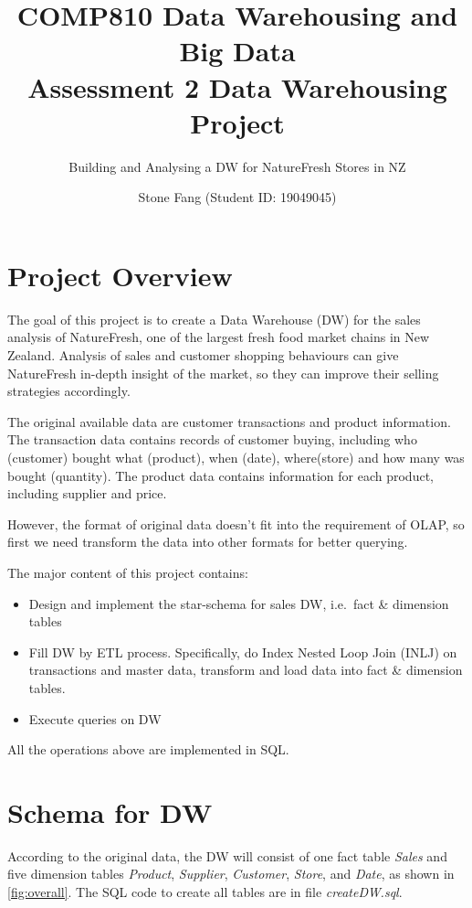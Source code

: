 \documentclass[
  a4paper,
]{article}
\title{    \textbf{COMP810 Data Warehousing and Big Data \\
    Assessment 2 Data Warehousing Project}}
\subtitle{Building and Analysing a DW for NatureFresh Stores in NZ}
\author{Stone Fang (Student ID: 19049045)}
\date{}
\providecommand{\tightlist}{%
  \setlength{\itemsep}{0pt}\setlength{\parskip}{0pt}}
\begin{document}
\maketitle

\hypertarget{project-overview}{%
\section{Project Overview}\label{project-overview}}

The goal of this project is to create a Data Warehouse (DW) for the
sales analysis of NatureFresh, one of the largest fresh food market
chains in New Zealand. Analysis of sales and customer shopping
behaviours can give NatureFresh in-depth insight of the market, so they
can improve their selling strategies accordingly.

The original available data are customer transactions and product
information. The transaction data contains records of customer buying,
including who (customer) bought what (product), when (date),
where(store) and how many was bought (quantity). The product data
contains information for each product, including supplier and price.

However, the format of original data doesn't fit into the requirement of
OLAP, so first we need transform the data into other formats for better
querying.

The major content of this project contains:

\begin{itemize}
\tightlist
\item
  Design and implement the star-schema for sales DW, i.e.~fact \&
  dimension tables
\item
  Fill DW by ETL process. Specifically, do Index Nested Loop Join (INLJ)
  on transactions and master data, transform and load data into fact \&
  dimension tables.
\item
  Execute queries on DW
\end{itemize}

All the operations above are implemented in SQL.

\hypertarget{schema-for-dw}{%
\section{Schema for DW}\label{schema-for-dw}}

According to the original data, the DW will consist of one fact table
\emph{Sales} and five dimension tables \emph{Product}, \emph{Supplier},
\emph{Customer}, \emph{Store}, and \emph{Date}, as shown in
\cref{fig:overall}. The SQL code to create all tables are in file
\emph{createDW.sql}.
\end{document}
